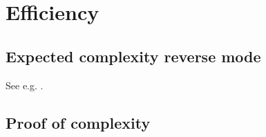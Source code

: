 \section{Efficiency}

\subsection{Expected complexity reverse mode} %
\label{sub:expected_complexity_reverse_mode}


See e.g. \cite{griewank2008evaluating}.


\subsection{Proof of complexity} %
\label{sub:proof_of_complexity}
